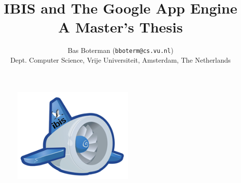 \documentclass[a4paper,11pt]{article}
\title{
  \textbf{IBIS and The Google App Engine}\\
  \Large A Master's Thesis
}
\author{
  Bas Boterman (\texttt{bboterm@cs.vu.nl})\\
  \small Dept. Computer Science, Vrije Universiteit, Amsterdam, The Netherlands
}
\begin{document}
\maketitle

\begin{figure}[h]
\begin{center}
\includegraphics[width=6cm]{msc_logo.png} 
\end{center}
\end{figure}


\newpage

\tableofcontents
\newpage


\newpage


\newpage


\newpage


\newpage

 
\newpage


\newpage


\newpage

\appendix


\newpage


\newpage


\newpage



\end{document}
